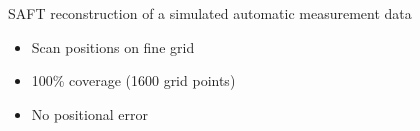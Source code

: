 \documentclass[12pt,compress,aspectratio=169]{beamer} %
\begin{document}
\begin{frame}[t]
{\begin{columns}[t]
\begin{column}{0.45\textwidth}
	SAFT reconstruction of a simulated automatic measurement data\\
	\vspace*{0.2cm}  
	\begin{itemize}
		\item Scan positions on fine grid
		\item 100\% coverage (1600 grid points)
		\item No positional error
	\end{itemize}
	\end{column}	
	\end{columns}
	}
	
\end{frame}
\end{document}
